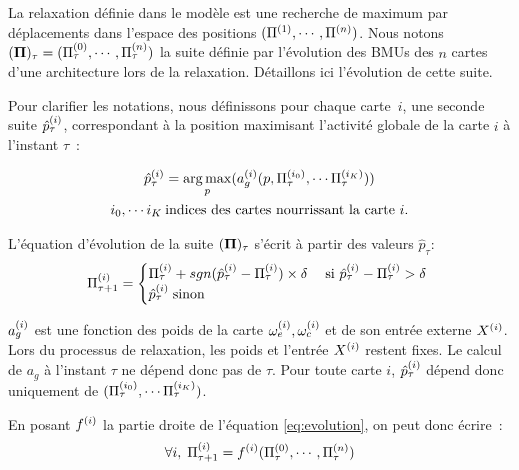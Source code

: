 \documentclass[../main]{subfiles}
\begin{document}
La relaxation définie dans le modèle est une recherche de maximum par déplacements dans l'espace des positions $(\Pi^{({1})},\cdots, \Pi^{({n})})$.
Nous notons $(\mathbf{\Pi})_\tau = (\Pi^{({0})}_\tau,\cdots,\Pi^{({n})}_\tau)$ la suite définie par l'évolution des BMUs des $n$ cartes d'une architecture lors de la relaxation.
Détaillons ici l'évolution de cette suite.

Pour clarifier les notations, nous définissons  pour chaque carte~$i$, une seconde suite $\hat{p}^{({i})}_\tau$, correspondant à la position maximisant l'activité globale de la carte $i$ à l'instant $\tau$~:

\begin{equation}
\begin{gathered}
\hat{p}^{({i})}_{\tau} = \operatorname*{arg\,max}_p(a_g^{({i})}(p,\Pi^{({i_0})}_\tau, \cdots \Pi^{({i_K})}_\tau))\\
 i_0, \cdots i_K \: \text{indices des cartes nourrissant la carte $i$}.
\end{gathered}
\label{eq:pstar}
\end{equation}

L'équation d'évolution de la suite $(\mathbf{\Pi})_\tau$ s'écrit à partir des valeurs $\hat{p}_\tau$: 
\begin{equation}
\Pi^{({i})}_{\tau+1} = 
\begin{cases}
\Pi^{({i})}_{\tau} + sgn(\hat{p}^{({i})}_{\tau} - \Pi^{({i})}_{\tau}) \times \delta \; & \text{si $\hat{p}^{({i})}_{\tau} - \Pi^{({i})}_{\tau} > \delta$ } \\
\hat{p}^{({i})}_{\tau} \; \text{sinon}	
\end{cases}
\label{eq:evolution}
\end{equation}

$a_g^{({i})}$ est une fonction des poids de la carte $\omega_{e}^{({i})}, \omega_{c}^{({i})}$ et de son entrée externe $X^{({i})}$. 
Lors du processus de relaxation, les poids et l'entrée $X^{({i})}$ restent fixes. 
Le calcul de $a_g$ à l'instant $\tau$ ne dépend donc pas de $\tau$. Pour toute carte $i$, $\hat{p}^{({i})}_{\tau}$ dépend donc uniquement de $(\Pi^{({i_0})}_\tau, \cdots \Pi^{({i_K})}_\tau)$. 

En posant $f^{({i})}$ la partie droite de l'équation \ref{eq:evolution}, on peut donc écrire~: 
\begin{equation}
\forall i, \; \Pi^{({i})}_{\tau +1} = f^{({i})}(\Pi^{({0})}_\tau,\cdots,\Pi^{({n})}_\tau)
\label{eq:fonction}
\end{equation}
\end{document}
